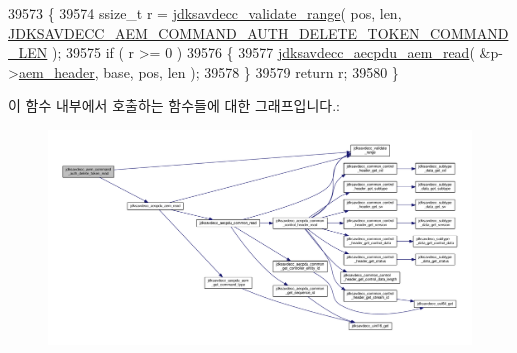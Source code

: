 \begin{DoxyCode}
39573 \{
39574     ssize\_t r = \hyperlink{group__util_ga9c02bdfe76c69163647c3196db7a73a1}{jdksavdecc\_validate\_range}( pos, len, 
      \hyperlink{group__command__auth__delete__token_gae99ef096c9374049377dbc7c54bd42a3}{JDKSAVDECC\_AEM\_COMMAND\_AUTH\_DELETE\_TOKEN\_COMMAND\_LEN} );
39575     \textcolor{keywordflow}{if} ( r >= 0 )
39576     \{
39577         \hyperlink{group__aecpdu__aem_gae2421015dcdce745b4f03832e12b4fb6}{jdksavdecc\_aecpdu\_aem\_read}( &p->\hyperlink{structjdksavdecc__aem__command__auth__delete__token_ae1e77ccb75ff5021ad923221eab38294}{aem\_header}, base, pos, len );
39578     \}
39579     \textcolor{keywordflow}{return} r;
39580 \}
\end{DoxyCode}


이 함수 내부에서 호출하는 함수들에 대한 그래프입니다.\+:
\nopagebreak
\begin{figure}[H]
\begin{center}
\leavevmode
\includegraphics[width=350pt]{group__command__auth__delete__token_ga8e401a9b92051b495a66c82eea4cb22c_cgraph}
\end{center}
\end{figure}


